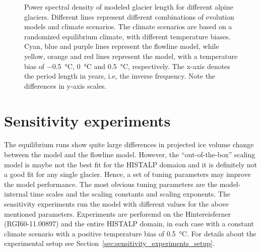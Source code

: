 \begin{figure}[htp]
\begin{subfigure}[b]{0.48\textwidth}
        \end{subfigure}

        \caption{Power spectral density of modeled glacier length for different alpine glaciers. Different lines represent different combinations of evolution models and climate scenarios. The climate scenarios are based on a randomized equilibrium climate, with different temperature biases. Cyan, blue and purple lines represent the flowline model, while yellow, orange and red lines represent the \vas{} model, with a temperature bias of \SI{-.5}{\celsius}, \SI{0}{\celsius} and \SI{+.5}{\celsius}, respectively. The x-axis denotes the period length in years, i.e, the inverse frequency. Note the differences in y-axis scales.}
        \label{fig:psd}
      \end{figure}
    


\section{Sensitivity experiments} %
\label{sec:sensitivity_experiments_results}

  The equilibrium runs show quite large differences in projected ice volume change between the \vas{} model and the flowline model. However, the “out-of-the-box” scaling model is maybe not the best fit for the HISTALP domaion and it is definitely not a good fit for any single glacier. Hence, a set of tuning parameters may improve the model performance.
  The most obvious tuning parameters are the model-internal time scales and the scaling constants and scaling exponents. The sensitivity experiments run the \vas{} model with different values for the above mentioned parameters. Experiments are perforemd on the Hintereisferner (RGI60-11.00897) and the entire HISTALP domain, in each case with a constant climate scenario with a positive temperature bias of \SI{+0.5}{\celsius}. For details about the experimental setup see Section~\ref{sec:sensitivity_experiments_setup}.

